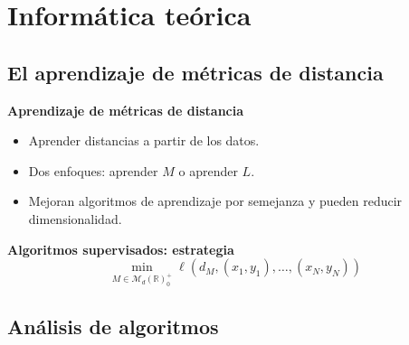\documentclass[10pt, compress]{beamer}
\newcommand\R{\mathbb{R}}
\begin{document}
\section{Informática teórica}

\subsection{El aprendizaje de métricas de distancia}

\begin{frame}
  \begin{tcolorbox}[colback=ChetwodeBlue!10,colframe=ChetwodeBlue!60]
    \begin{center}
      {\color{TurkishRose} \small\textbf{Aprendizaje de métricas de distancia}}
      \begin{itemize}
        \item Aprender distancias a partir de los datos.
        \item Dos enfoques: aprender $M$ o aprender $L$.
        \item Mejoran algoritmos de aprendizaje por semejanza y pueden reducir dimensionalidad.
      \end{itemize}
    \end{center}
  \end{tcolorbox}

  \begin{tcolorbox}[colback=ChetwodeBlue!10,colframe=ChetwodeBlue!60]
    \begin{center}
      {\color{TurkishRose} \small\textbf{Algoritmos supervisados: estrategia}}
      \[ \min_{M \in \mathcal{M}_d(\R)^+_0} \ell(d_M, (x_1,y_1), \dots, (x_N, y_N)) \]
    \end{center}
  \end{tcolorbox}
\end{frame}

\subsection{Análisis de algoritmos}
\end{document}
